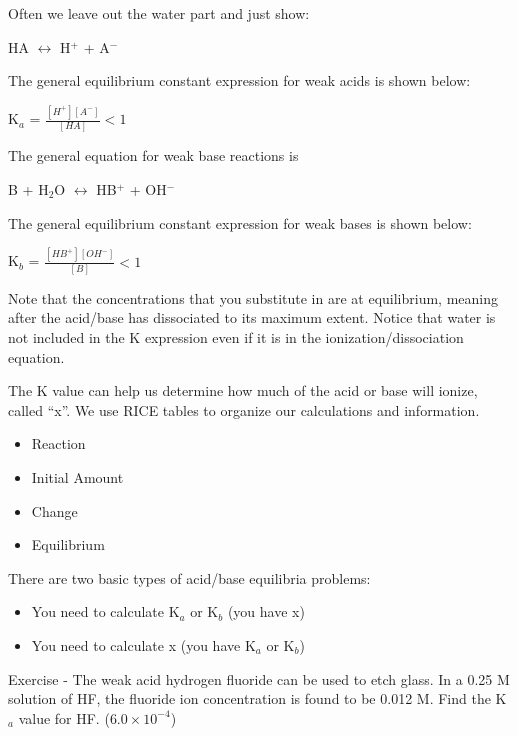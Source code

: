 \documentclass[../hchem.tex]{subfiles}
\begin{document}
Often we leave out the water part and just show:
\begin{center}
    HA $\leftrightarrow$ H$^+$ + A$^-$
\end{center}

The general equilibrium constant expression for weak acids is shown below:
\begin{center}
    K$_a$ = $\frac{[H^+][A^-]}{[HA]}<1$
\end{center}

The general equation for weak base reactions is 
\begin{center}
    B + H$_2$O $\leftrightarrow$ HB$^+$ + OH$^-$
\end{center}

The general equilibrium constant expression for weak bases is shown below:
\begin{center}
    K$_b$ = $\frac{[HB^+][OH^-]}{[B]}<1$
\end{center}

Note that the concentrations that you substitute in are at equilibrium, meaning after the acid/base has dissociated to its maximum extent. Notice that 
water is not included in the K expression even if it is in the ionization/dissociation equation.

The K value can help us determine how much of the acid or base will ionize, called ``x''. We use RICE tables to organize our calculations and information.
\begin{itemize}
    \item Reaction 
    \item Initial Amount 
    \item Change 
    \item Equilibrium 
\end{itemize}
There are two basic types of acid/base equilibria problems:
\begin{itemize}
    \item You need to calculate K$_a$ or K$_b$ (you have x)
    \item You need to calculate x (you have K$_a$ or K$_b$)
\end{itemize}

Exercise - The weak acid hydrogen fluoride can be used to etch glass. In a 0.25 M solution of HF, the fluoride ion concentration is found to be 0.012 M. Find the K$_a$ value for HF. ($6.0\times 10^{-4}$)
\end{document}
